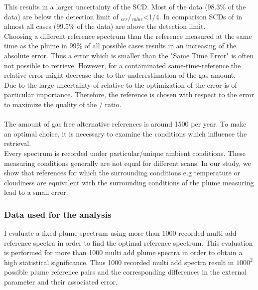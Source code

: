 %
This results in a larger uncertainty of the   SCD. Most of the  data (98.3\% of the data) are below the detection limit of $_{err}$/$_{value}$<1/4. In comparison SCDs of  in almost all cases (99.5\% of the data)  are above the detection limit. \\
%
Choosing a different reference spectrum than the reference measured at the same time as the plume in 99\% of all possible cases results in an increasing of the absolute error. 
Thus a  error which is smaller than the "Same Time Error" is often not  possible to retrieve. 
However, for a contaminated same-time-reference the relative error might decrease due to the underestimation of the gas amount. \\
Due to the large uncertainty of  relative to  the optimization of the  error is of particular importance. Therefore, the reference is chosen with respect to the  error to maximize the quality of the / ratio. \\
\\
The amount of gas free alternative references is around 1500 per year. To make an optimal choice, it is necessary to examine the conditions which influence the  retrieval.\\
Every spectrum is recorded under particular/unique ambient conditions. These measuring conditions generally are not equal for different scans. In our study, we show that references for which the surrounding conditions e.g temperature or cloudiness are equivalent with the surrounding conditions of the  plume measuring lead to a small error.\\
%
\subsubsection*{Data used for the analysis}
I evaluate a fixed plume spectrum using more than 1000 recorded multi add reference spectra in order to find the optimal reference spectrum. This evaluation is performed for more than 1000 multi add plume spectra in order to obtain a high statistical significance. Thus 1000 recorded multi add spectra result in $1000^2$ possible plume reference pairs and the corresponding differences in the external parameter and their associated  error. 


